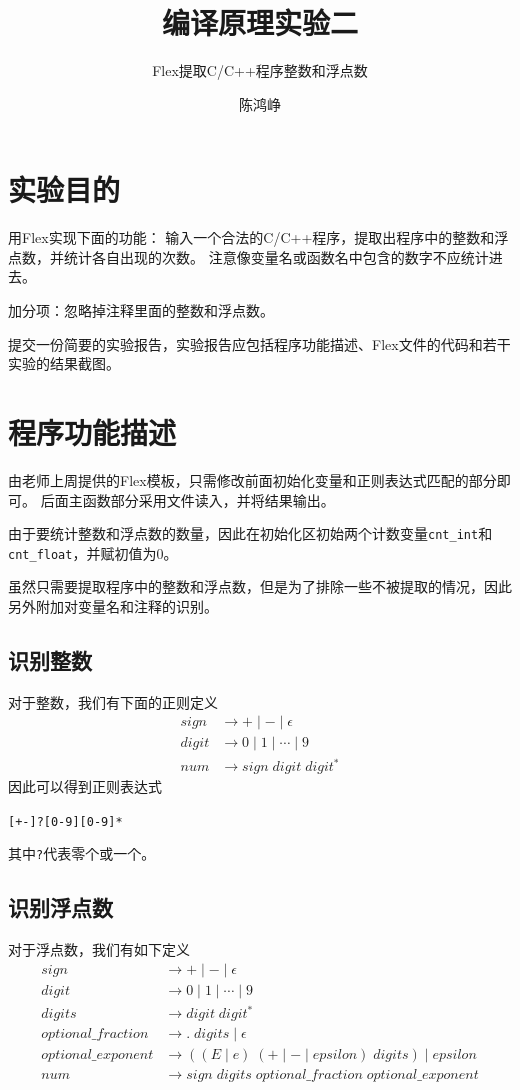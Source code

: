 \documentclass[logo,reportComp]{thesis}
\title{编译原理实验二}
\subtitle{Flex提取C/C++程序整数和浮点数}
\author{陈鸿峥}
\begin{document}
\maketitle

\section{实验目的}
用Flex实现下面的功能：
输入一个合法的C/C++程序，提取出程序中的整数和浮点数，并统计各自出现的次数。
注意像变量名或函数名中包含的数字不应统计进去。

加分项：忽略掉注释里面的整数和浮点数。

提交一份简要的实验报告，实验报告应包括程序功能描述、Flex文件的代码和若干实验的结果截图。

\section{程序功能描述}
由老师上周提供的Flex模板，只需修改前面初始化变量和正则表达式匹配的部分即可。
后面主函数部分采用文件读入，并将结果输出。

由于要统计整数和浮点数的数量，因此在初始化区初始两个计数变量\texttt{cnt\_int}和\texttt{cnt\_float}，并赋初值为$0$。

虽然只需要提取程序中的整数和浮点数，但是为了排除一些不被提取的情况，因此另外附加对变量名和注释的识别。

\subsection{识别整数}
对于整数，我们有下面的正则定义
\[\begin{aligned}
sign &\to + \mid - \mid \epsilon\\
digit &\to 0 \mid 1 \mid \cdots \mid 9\\
num &\to sign\;digit\;digit^*
\end{aligned}\]
因此可以得到正则表达式
\begin{center}
\verb'[+-]?[0-9][0-9]*'
\end{center}
其中\verb'?'代表零个或一个。

\subsection{识别浮点数}
对于浮点数，我们有如下定义
\[\begin{aligned}
sign &\to + \mid - \mid \epsilon\\
digit &\to 0 \mid 1 \mid \cdots \mid 9\\
digits &\to digit\; digit^*\\
optional\_fraction &\to .\; digits \mid \epsilon\\
optional\_exponent &\to ((E \mid e)\; (+ \mid - \mid epsilon)\; digits) \mid epsilon\\
num &\to sign\; digits\; optional\_fraction\; optional\_exponent
\end{aligned}\]
\end{document}

